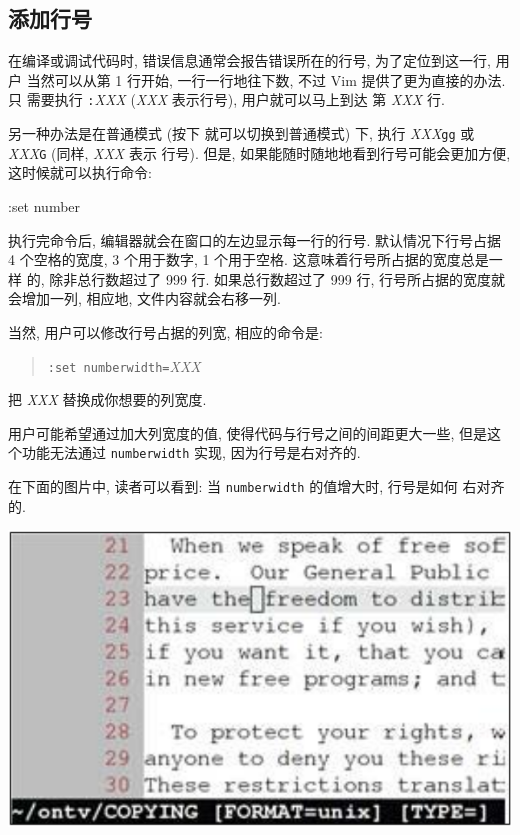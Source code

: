 \subsection{添加行号}
\label{subsec:adding_line_numbers}
在编译或调试代码时, 错误信息通常会报告错误所在的行号, 为了定位到这一行, 用户
当然可以从第 1 行开始, 一行一行地往下数, 不过 Vim 提供了更为直接的办法. 只
需要执行 \texttt{:}\textit{XXX} (\textit{XXX} 表示行号), 用户就可以马上到达
第 \textit{XXX} 行.

另一种办法是在普通模式 (按下  就可以切换到普通模式) 下, 执行 
\textit{XXX}\texttt{gg} 或 \textit{XXX}\texttt{G} (同样, \textit{XXX} 表示 
行号). 但是, 如果能随时随地地看到行号可能会更加方便, 这时候就可以执行命令:
\begin{vimcmd}
:set number
\end{vimcmd}

执行完命令后, 编辑器就会在窗口的左边显示每一行的行号. 默认情况下行号占据 4
个空格的宽度, 3 个用于数字, 1 个用于空格. 这意味着行号所占据的宽度总是一样
的, 除非总行数超过了 999 行. 如果总行数超过了 999 行, 行号所占据的宽度就
会增加一列, 相应地, 文件内容就会右移一列.

当然, 用户可以修改行号占据的列宽, 相应的命令是:
\begin{quotation}
\texttt{:set numberwidth=}\textit{XXX}
\end{quotation}
把 \textit{XXX} 替换成你想要的列宽度.

\begin{warning}
    用户可能希望通过加大列宽度的值, 使得代码与行号之间的间距更大一些, 
    但是这个功能无法通过 \texttt{numberwidth} 实现, 因为行号是右对齐的.
\end{warning}

在下面的图片中, 读者可以看到: 当 \texttt{numberwidth} 的值增大时, 行号是如何
右对齐的.

\begin{center}
\includegraphics[scale=0.6]{./images/page40.png}
\end{center}

